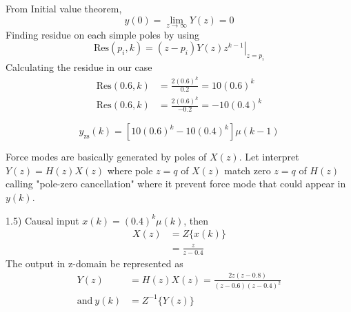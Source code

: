 \documentclass[12pt]{article}
\begin{document}
From Initial value theorem,\
\begin{equation*}
    y(0) = \lim_{z\rightarrow\infty}Y(z) = 0
\end{equation*}
Finding residue on each simple poles by using
\begin{equation*}
    \text{Res}(p_i, k) = \left.(z-p_i)Y(z)z^{k-1}\right|_{z=p_i}
\end{equation*}
Calculating the residue in our case
\begin{equation*}
\begin{split}
    \text{Res}(0.6, k) &= \frac{2(0.6)^k}{0.2} = 10 (0.6)^k \\
    \text{Res}(0.6, k) &= \frac{2(0.6)^k}{-0.2} = -10 (0.4)^k
\end{split}
\end{equation*}

\begin{equation*}
    y_\text{zs}(k) = [10(0.6)^k - 10(0.4)^k]\mu(k-1)
\end{equation*}

Force modes are basically generated by poles of $X(z)$.
Let interpret $Y(z)=H(z)X(z)$ where pole $z=q$ of $X(z)$ match 
zero $z=q$ of $H(z)$ calling "pole-zero cancellation" where it 
prevent force mode that could appear in $y(k)$.

1.5) Causal input $x(k)=(0.4)^k\mu(k)$, then
\begin{equation*}
\begin{split}
    X(z) &= Z\{x(k)\} \\
        &= \frac{z}{z-0.4}
\end{split}
\end{equation*}
The output in z-domain be represented as
\begin{equation*}
\begin{split}
    Y(z) &= H(z)X(z) = \frac{2z(z-0.8)}{(z-0.6)(z-0.4)^2} \\
    \text{and}\ y(k) &= Z^{-1}\{Y(z)\}
\end{split}
\end{equation*}
\end{document}
